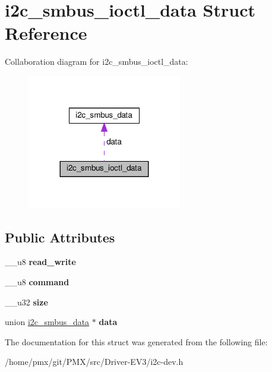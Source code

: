 \hypertarget{structi2c__smbus__ioctl__data}{}\section{i2c\+\_\+smbus\+\_\+ioctl\+\_\+data Struct Reference}
\label{structi2c__smbus__ioctl__data}


Collaboration diagram for i2c\+\_\+smbus\+\_\+ioctl\+\_\+data\+:
\nopagebreak
\begin{figure}[H]
\begin{center}
\leavevmode
\includegraphics[width=191pt]{structi2c__smbus__ioctl__data__coll__graph}
\end{center}
\end{figure}
\subsection*{Public Attributes}
\begin{DoxyCompactItemize}
\item 
\mbox{\label{structi2c__smbus__ioctl__data_a545643b68fb6ee6806aadc62f5c9a9b0}} 
\+\_\+\+\_\+u8 {\bfseries read\+\_\+write}
\item 
\mbox{\label{structi2c__smbus__ioctl__data_a5c97619b99fbc3231d877acfe428826b}} 
\+\_\+\+\_\+u8 {\bfseries command}
\item 
\mbox{\label{structi2c__smbus__ioctl__data_a8656ac3dfa404899f6549baea41cf342}} 
\+\_\+\+\_\+u32 {\bfseries size}
\item 
\mbox{\label{structi2c__smbus__ioctl__data_af5a53e4ed38f278bd5fb62a65b67432d}} 
union \hyperlink{unioni2c__smbus__data}{i2c\+\_\+smbus\+\_\+data} $\ast$ {\bfseries data}
\end{DoxyCompactItemize}


The documentation for this struct was generated from the following file\+:\begin{DoxyCompactItemize}
\item 
/home/pmx/git/\+P\+M\+X/src/\+Driver-\/\+E\+V3/i2c-\/dev.\+h\end{DoxyCompactItemize}
